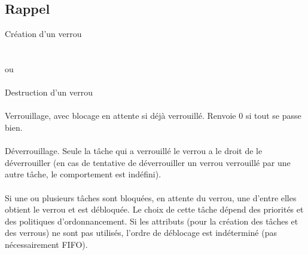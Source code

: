 \subsection*{Rappel}
Création d'un verrou \\
\hspace*{1cm} \\
\hspace*{5cm} \\
ou \\
\hspace*{1cm} \\
Destruction d'un verrou \\
\hspace*{1cm} \\
Verrouillage, avec blocage en attente si déjà verrouillé. Renvoie 0 si tout se passe bien. \\
\hspace*{1cm} \\
Déverrouillage. Seule la tâche qui a verrouillé le verrou a le droit de le déverrouiller (en cas de tentative de déverrouiller un verrou verrouillé par une autre tâche, le comportement est indéfini). \\
\hspace*{1cm} \\
Si une ou plusieurs tâches sont bloquées, en attente du verrou, une d'entre elles obtient le verrou et est débloquée. Le choix de cette tâche dépend des priorités et des politiques d'ordonnancement. Si les attributs (pour la création des tâches et des verrous) ne sont pas utilisés, l'ordre de déblocage est indéterminé (pas nécessairement FIFO).

